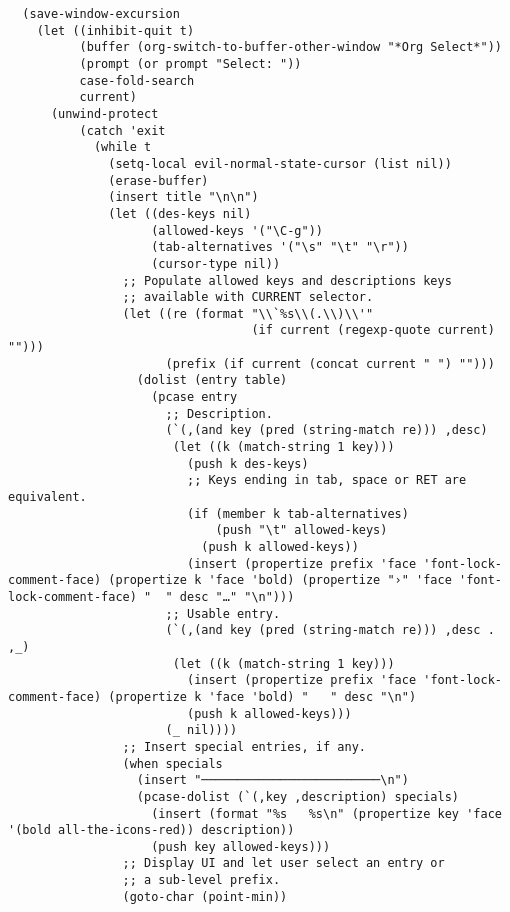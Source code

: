\documentclass[11pt]{article}
\begin{document}
\begin{verbatim}
  (save-window-excursion
    (let ((inhibit-quit t)
          (buffer (org-switch-to-buffer-other-window "*Org Select*"))
          (prompt (or prompt "Select: "))
          case-fold-search
          current)
      (unwind-protect
          (catch 'exit
            (while t
              (setq-local evil-normal-state-cursor (list nil))
              (erase-buffer)
              (insert title "\n\n")
              (let ((des-keys nil)
                    (allowed-keys '("\C-g"))
                    (tab-alternatives '("\s" "\t" "\r"))
                    (cursor-type nil))
                ;; Populate allowed keys and descriptions keys
                ;; available with CURRENT selector.
                (let ((re (format "\\`%s\\(.\\)\\'"
                                  (if current (regexp-quote current) "")))
                      (prefix (if current (concat current " ") "")))
                  (dolist (entry table)
                    (pcase entry
                      ;; Description.
                      (`(,(and key (pred (string-match re))) ,desc)
                       (let ((k (match-string 1 key)))
                         (push k des-keys)
                         ;; Keys ending in tab, space or RET are equivalent.
                         (if (member k tab-alternatives)
                             (push "\t" allowed-keys)
                           (push k allowed-keys))
                         (insert (propertize prefix 'face 'font-lock-comment-face) (propertize k 'face 'bold) (propertize "›" 'face 'font-lock-comment-face) "  " desc "…" "\n")))
                      ;; Usable entry.
                      (`(,(and key (pred (string-match re))) ,desc . ,_)
                       (let ((k (match-string 1 key)))
                         (insert (propertize prefix 'face 'font-lock-comment-face) (propertize k 'face 'bold) "   " desc "\n")
                         (push k allowed-keys)))
                      (_ nil))))
                ;; Insert special entries, if any.
                (when specials
                  (insert "─────────────────────────\n")
                  (pcase-dolist (`(,key ,description) specials)
                    (insert (format "%s   %s\n" (propertize key 'face '(bold all-the-icons-red)) description))
                    (push key allowed-keys)))
                ;; Display UI and let user select an entry or
                ;; a sub-level prefix.
                (goto-char (point-min))

\end{verbatim}
\end{document}
